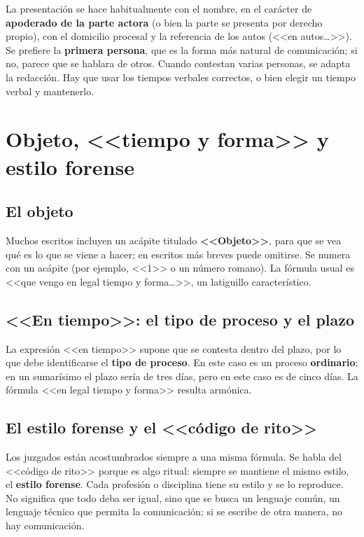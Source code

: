 \documentclass[12pt,oneside]{book}
\begin{document}
La presentación se hace habitualmente con el nombre, en el carácter de \textbf{apoderado de la parte actora} (o bien la parte se presenta por derecho propio), con el domicilio procesal y la referencia de los autos (<<en autos\ldots>>). Se prefiere la \textbf{primera persona}, que es la forma más natural de comunicación; si no, parece que se hablara de otros. Cuando contestan varias personas, se adapta la redacción. Hay que usar los tiempos verbales correctos, o bien elegir un tiempo verbal y mantenerlo.

\section{Objeto, <<tiempo y forma>> y estilo forense}

\subsection{El objeto}

Muchos escritos incluyen un acápite titulado \textbf{<<Objeto>>}, para que se vea qué es lo que se viene a hacer; en escritos más breves puede omitirse. Se numera con un acápite (por ejemplo, <<1>> o un número romano). La fórmula usual es <<que vengo en legal tiempo y forma\ldots>>, un latiguillo característico.

\subsection{<<En tiempo>>: el tipo de proceso y el plazo}

La expresión <<en tiempo>> supone que se contesta dentro del plazo, por lo que debe identificarse el \textbf{tipo de proceso}. En este caso es un proceso \textbf{ordinario}; en un sumarísimo el plazo sería de tres días, pero en este caso es de cinco días. La fórmula <<en legal tiempo y forma>> resulta armónica.


\subsection{El estilo forense y el <<código de rito>>}

Los juzgados están acostumbrados siempre a una misma fórmula. Se habla del <<código de rito>> porque es algo ritual: siempre se mantiene el mismo estilo, el \textbf{estilo forense}. Cada profesión o disciplina tiene su estilo y se lo reproduce. No significa que todo deba ser igual, sino que se busca un lenguaje común, un lenguaje técnico que permita la comunicación; si se escribe de otra manera, no hay comunicación.
\end{document}
